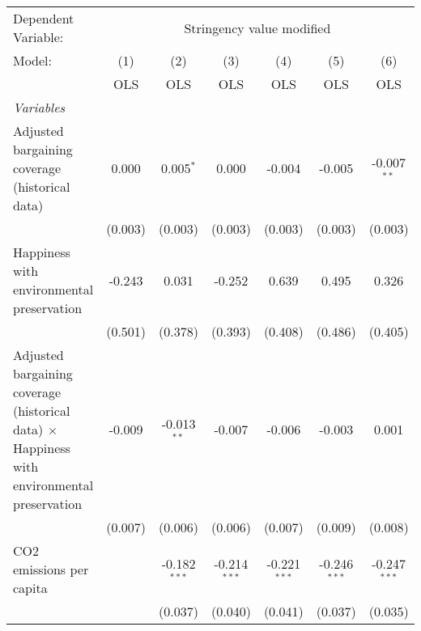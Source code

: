 
\begingroup
\centering
\begin{tabular}{lcccccc}
   \toprule
   Dependent Variable: & \multicolumn{6}{c}{Stringency value modified}\\
   Model:                                                                                             & (1)     & (2)            & (3)            & (4)            & (5)            & (6)\\  
                                                                                                      &  OLS    & OLS            & OLS            & OLS            & OLS            & OLS\\  
   \midrule
   \emph{Variables}\\
   Adjusted bargaining coverage (historical data)                                                     & 0.000   & 0.005$^{*}$    & 0.000          & -0.004         & -0.005         & -0.007$^{**}$\\   
                                                                                                      & (0.003) & (0.003)        & (0.003)        & (0.003)        & (0.003)        & (0.003)\\   
   Happiness with environmental preservation                                                          & -0.243  & 0.031          & -0.252         & 0.639          & 0.495          & 0.326\\   
                                                                                                      & (0.501) & (0.378)        & (0.393)        & (0.408)        & (0.486)        & (0.405)\\   
   Adjusted bargaining coverage (historical data) $\times$ Happiness with environmental preservation  & -0.009  & -0.013$^{**}$  & -0.007         & -0.006         & -0.003         & 0.001\\   
                                                                                                      & (0.007) & (0.006)        & (0.006)        & (0.007)        & (0.009)        & (0.008)\\   
   CO2 emissions per capita                                                                           &         & -0.182$^{***}$ & -0.214$^{***}$ & -0.221$^{***}$ & -0.246$^{***}$ & -0.247$^{***}$\\   
                                                                                                      &         & (0.037)        & (0.040)        & (0.041)        & (0.037)        & (0.035)\\   

\end{tabular}
